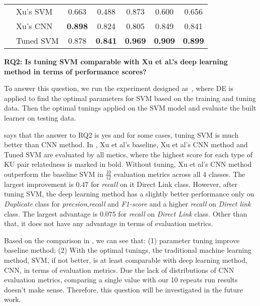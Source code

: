 \begin{table}[!htp]
{\begin{tabular} {@{}l l  c c  c c c@{}}
   & Xu's SVM& 0.663 &  0.488  & 0.873 &  0.600 &0.656 \\ 
   & Xu's CNN& \textbf{0.898} &  0.824  & 0.805 &  0.849 &0.841 \\
   & Tuned SVM& 0.878 & \textbf{ 0.841}  &\textbf{ 0.969} &  \textbf{0.909} &\textbf{0.899} \\\hline
 \end{tabular}}
\label{tab:RQ2}
\end{table}

\textbf{RQ2: Is tuning SVM comparable with Xu et al.'s deep learning method in terms of performance scores?}

To answer this question, we run the experiment designed as~, where DE is applied to 
find the optimal parameters for SVM based on the training and tuning data. Then the optimal tunings
applied on the SVM model and evaluate the built learner on testing data.

 says that the answer to RQ2 is yes and for some cases, tuning SVM is much better than
CNN method. In ,  Xu et al's baseline, Xu et al's CNN method and Tuned SVM are
evaluated by all metics, where the highest score for each type of KU pair
relatedness is marked in bold.  Without tuning, Xu et al's CNN method outperform
the baseline SVM in $\frac{10}{12}$ evaluation metrics across all 4 classes. 
The largest improvement is $0.47$ for {\it recall} on {it Direct Link} class. However, after tuning SVM, the deep learning
method has a slightly better performance only on {\it Duplicate} class for {\it precsion},{\it recall} and {\it F1-score} and 
 a higher {\it recall} on {\it Direct link} class. The largest advantage is $0.075$ for {\it recall} on {\it Direct Link} class.
 Other than that, it does not have any advantage in terms of evaluation
 metrics.
 
 Based on the comparison in , we can see that: (1) parameter tuning improve baseline method;
 (2) With the optimal tunings, the traditional machine learning method, SVM, if not better, is at least comparable 
 with deep learning method, CNN, in terms of evaluation metrics.  
 Due the lack of distributions of CNN evaluation metrics, comparing a single value with our 10 repeats run results doesn't
 make sense. Therefore, this question will be investigated in the future work.
 
